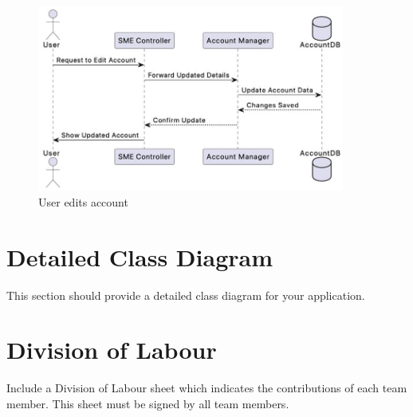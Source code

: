 \documentclass[]{article}
\begin{document}
\begin{figure}[H]
    \centering
    \includegraphics[width=0.9\textwidth]{S3/image (7).jpeg}
	\caption{User edits account}
\end{figure}




\section{Detailed Class Diagram}
\label{sec:detailed_class_diagram}
This section should provide a detailed class diagram for your application.

\appendix
\section{Division of Labour}
\label{sec:division_of_labour}
Include a Division of Labour sheet which indicates the contributions of each team member. This sheet must be signed by all team members.

\newpage
\end{document}
